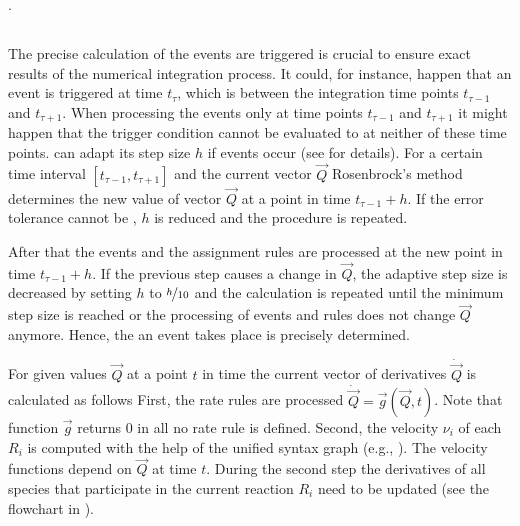\documentclass[10pt]{bmc_article}
\newenvironment{bmcformat}{\begin{raggedright}\baselineskip20pt\sloppy\setboolean{publ}{false}}{\end{raggedright}\baselineskip20pt\sloppy}
\begin{document}
\begin{bmcformat}
.

\subsection*{}

The precise calculation of the  events are triggered is crucial
to ensure exact results of the numerical integration process.
It could, for instance, happen that an event is triggered at time $t_{\tau}$,
which is between the integration time points $t_{\tau - 1}$ and $t_{\tau + 1}$.
When processing the events only at time points $t_{\tau - 1}$ and $t_{\tau + 1}$\COR{,}
it might happen that the trigger condition cannot be evaluated to \true at
neither of these time points.
 \cite{Press1993} can adapt its step size $h$ if events
occur (see  for details).
For a certain time interval $[t_{\tau - 1}, t_{\tau + 1}]$ and the current vector
$\vec{Q}$\COR{,} Rosenbrock's method determines the new value of vector $\vec{Q}$ at a
point in time $t_{\tau - 1} + h$.
If the error tolerance cannot be ,
$h$ is reduced and the procedure is repeated.

After that\COR{,} the events and the assignment rules are processed at the new
point in time $t_{\tau - 1} + h$.
If the previous step causes a change in $\vec{Q}$, the adaptive step size is
decreased by setting $h$ to $\nicefrac{h}{10}$ and the calculation is repeated
until  the minimum step size is reached or the processing of events
and  rules does not change $\vec{Q}$ anymore.
Hence, the  an event takes place is precisely determined.

For given values $\vec{Q}$ at a point $t$ in time the current vector of
derivatives $\dot{\vec{Q}}$ is calculated as follows
First, the rate rules are processed $\dot{\vec{Q}} = \vec{g}(\vec{Q}, t)$.
Note that function $\vec{g}$ returns 0 in all  no rate
rule is defined.
Second, the velocity $\nu_i$ of each  $R_i$ is computed
with the help of the unified syntax graph (e.g., ).
The velocity functions depend on $\vec{Q}$ at time $t$.
During the second step\COR{,} the derivatives of all species that participate in
the current reaction $R_i$ need to be updated (see the flowchart in
).


\end{bmcformat}
\end{document}
